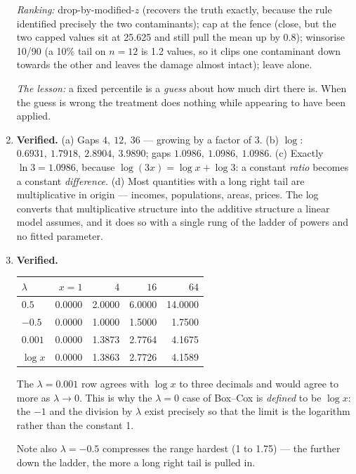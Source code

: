 \documentclass[11pt,a4paper]{article}
\newcommand{\A}[1]{\item[\textbf{#1}]}
\begin{document}
\begin{enumerate}[leftmargin=1.9cm]
\begin{answerbox}
\emph{Ranking:} drop-by-modified-$z$ (recovers the truth exactly, because the
rule identified precisely the two contaminants); cap at the fence (close, but
the two capped values sit at 25.625 and still pull the mean up by 0.8); winsorise
10/90 (a 10\% tail on $n=12$ is 1.2 values, so it clips one contaminant down
towards the other and leaves the damage almost intact); leave alone.

\emph{The lesson:} a fixed percentile is a \emph{guess} about how much dirt
there is. When the guess is wrong the treatment does nothing while appearing to
have been applied.
\end{answerbox}

\A{U4.60} \textbf{Verified.} (a) Gaps $4,\ 12,\ 36$ --- growing by a factor of
3. (b) $\log$: $0.6931,\ 1.7918,\ 2.8904,\ 3.9890$; gaps
$\mathbf{1.0986,\ 1.0986,\ 1.0986}$. (c) Exactly $\ln 3 = 1.0986$, because
$\log(3x) = \log x + \log 3$: a constant \emph{ratio} becomes a constant
\emph{difference}. (d) Most quantities with a long right tail are multiplicative
in origin --- incomes, populations, areas, prices. The log converts that
multiplicative structure into the additive structure a linear model assumes,
and it does so with a single rung of the ladder of powers and no fitted
parameter.

\A{U4.61} \textbf{Verified.}
\begin{answerbox}
\begin{center}\begin{tabular}{@{}lrrrr@{}}\toprule
$\lambda$ & $x=1$ & $4$ & $16$ & $64$\\
\midrule
$0.5$ & 0.0000 & 2.0000 & 6.0000 & 14.0000\\
$-0.5$ & 0.0000 & 1.0000 & 1.5000 & 1.7500\\
$0.001$ & 0.0000 & 1.3873 & 2.7764 & 4.1675\\
$\log x$ & 0.0000 & 1.3863 & 2.7726 & 4.1589\\
\bottomrule\end{tabular}\end{center}
The $\lambda = 0.001$ row agrees with $\log x$ to three decimals and would
agree to more as $\lambda \to 0$. This is why the $\lambda = 0$ case of
Box--Cox is \emph{defined} to be $\log x$: the $-1$ and the division by
$\lambda$ exist precisely so that the limit is the logarithm rather than the
constant 1.

Note also $\lambda = -0.5$ compresses the range hardest (1 to 1.75) --- the
further down the ladder, the more a long right tail is pulled in.
\end{answerbox}


\end{enumerate}
\end{document}
